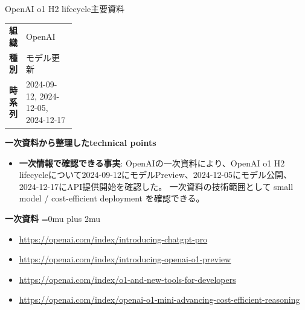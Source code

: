 \begin{technicalnote}{OpenAI o1 H2 lifecycle}{主要資料}
\begingroup
\begin{tabularx}{\linewidth}{@{}>{\bfseries}p{0.22\linewidth}X@{}}
組織 & OpenAI \\
種別 & モデル更新 \\
時系列 & 2024-09-12, 2024-12-05, 2024-12-17 \\
\end{tabularx}
\smallskip
{\bfseries 一次資料から整理したtechnical points}
\begin{itemize}[leftmargin=1.5em,itemsep=0.35em]
\item \textbf{一次情報で確認できる事実}: OpenAIの一次資料により、OpenAI o1 H2 lifecycleについて2024-09-12にモデルPreview、2024-12-05にモデル公開、2024-12-17にAPI提供開始を確認した。 一次資料の技術範囲として small model / cost-efficient deployment を確認できる。
\end{itemize}
\begin{minipage}{\linewidth}
\begin{samepage}
{\bfseries 一次資料}
\begingroup\sloppy
\Urlmuskip=0mu plus 2mu\relax
\begin{itemize}[leftmargin=1.5em,itemsep=0.25em]
\item {\scriptsize\url{https://openai.com/index/introducing-chatgpt-pro}}
\item {\scriptsize\url{https://openai.com/index/introducing-openai-o1-preview}}
\item {\scriptsize\url{https://openai.com/index/o1-and-new-tools-for-developers}}
\item {\scriptsize\url{https://openai.com/index/openai-o1-mini-advancing-cost-efficient-reasoning}}
\end{itemize}
\endgroup
\end{samepage}
\end{minipage}
\endgroup
\end{technicalnote}
\medskip

